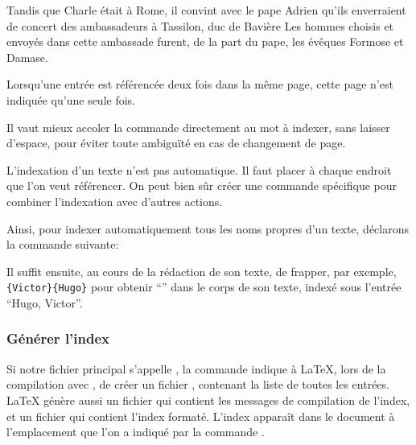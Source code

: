 \begin{latexcode}
Tandis que Charle était à Rome, il convint
avec le pape Adrien qu’ils enverraient de concert
des ambassadeurs à Tassilon, duc de Bavière
\textelp{}
Les hommes choisis et envoyés dans cette ambassade furent, de 
la part du pape, les évêques Formose et 
Damase\textelp{}.
\end{latexcode}



Lorsqu'une entrée est référencée deux fois dans la même page, cette page n'est indiquée qu'une seule fois. 

\begin{attention}
Il vaut mieux accoler la commande  directement au  mot à indexer, sans laisser d'espace, pour éviter toute ambiguïté en cas de changement de page.
\end{attention}


L'indexation d'un texte n'est pas automatique. Il faut placer  à chaque endroit  que l'on veut référencer. On  peut bien sûr créer une commande  spécifique pour combiner l'indexation avec d'autres actions.

Ainsi, pour indexer automatiquement tous les noms propres d'un texte, déclarons la commande suivante:\label{indexauteur}

\begin{latexcode}
\newcommand\auteur[2]{#1~\textsc{#2}\index{#2, #1}\xspace}
\end{latexcode}

\ifdefmacro{\auteur}{
\renewcommand\auteur[2]{#1~\textsc{#2}\xspace}}{\newcommand\auteur[2]{#1~\textsc{#2}\xspace}}

Il suffit ensuite, au cours de la rédaction de son texte, de frapper, par exemple, \verb|{Victor}{Hugo}| pour obtenir \enquote{} dans le corps de son texte, indexé sous l'entrée \enquote{Hugo, Victor}.


\subsubsection{Générer l'index}

Si notre fichier principal s'appelle ,  la commande  indique à \LaTeX{}, lors de la compilation avec \XeLaTeX, de créer un fichier , contenant la liste de toutes les entrées. 
\LaTeX{} génère aussi un fichier  qui contient les messages de compilation de l'index, et un fichier  qui contient l'index formaté.
L'index  apparaît dans le document à l'emplacement que l'on a indiqué par la commande .

